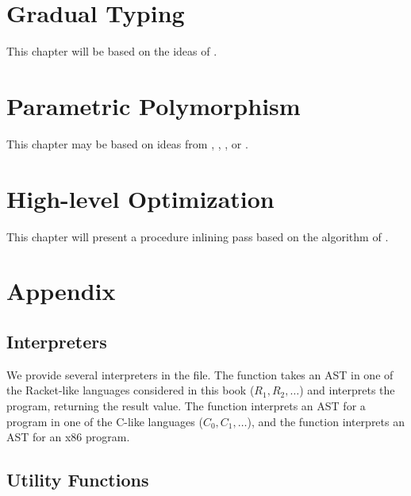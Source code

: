 \documentclass[11pt]{book}
\begin{document}
\chapter{Gradual Typing}
\label{ch:gradual-typing}

This chapter will be based on the ideas of \citet{Siek:2006bh}.

\chapter{Parametric Polymorphism}
\label{ch:parametric-polymorphism}

This chapter may be based on ideas from \citet{Cardelli:1984aa},
\citet{Leroy:1992qb}, \citet{Shao:1997uj}, or \citet{Harper:1995um}.





\chapter{High-level Optimization}
\label{ch:high-level-optimization}

This chapter will present a procedure inlining pass based on the
algorithm of \citet{Waddell:1997fk}.


\chapter{Appendix}

\section{Interpreters}
\label{appendix:interp}

We provide several interpreters in the  file.  The
 function takes an AST in one of the Racket-like
languages considered in this book ($R_1, R_2, \ldots$) and interprets
the program, returning the result value.  The  function
interprets an AST for a program in one of the C-like languages ($C_0,
C_1, \ldots$), and the  function interprets an AST
for an x86 program.

\section{Utility Functions}
\label{appendix:utilities}
\end{document}
